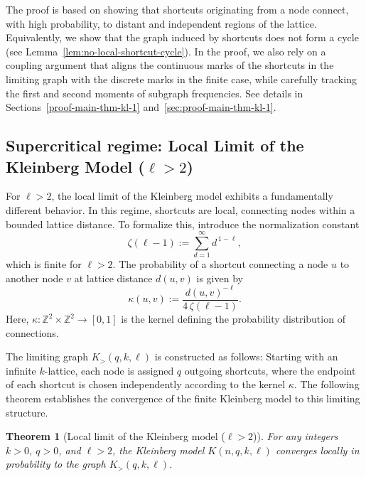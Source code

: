 \documentclass[10pt]{amsart}
\newtheorem{theorem}{Theorem}[section]
\begin{document}
The proof is based on showing that shortcuts originating from a node connect, with high probability, to distant and independent regions of the lattice.  Equivalently, we show that the graph induced by shortcuts does not form a cycle (see Lemma~\ref{lem:no-local-shortcut-cycle}).  In the proof, we also rely on a coupling argument that aligns the continuous marks of the shortcuts in the limiting graph with the discrete marks in the finite case, while carefully tracking the first and second moments of subgraph frequencies. See details in Sections~\ref{proof-main-thm-kl-1} and~\ref{sec:proof-main-thm-kl-1}. 


\subsection{Supercritical regime: Local Limit of the Kleinberg Model ($\ell > 2$)} \label{local-limit-kl-2}

For \(\ell > 2\), the local limit of the Kleinberg model exhibits a fundamentally different behavior. In this regime, shortcuts are local, connecting nodes within a bounded lattice distance. To formalize this, introduce the normalization constant
\[
\zeta(\ell-1) := \sum_{d=1}^{\infty} d^{\,1-\ell},
\]
which is finite for \(\ell > 2\). The probability of a shortcut connecting a node \(u\) to another node \(v\) at lattice distance \(d(u,v)\) is given by
\[
\kappa(u,v) := \frac{d(u,v)^{-\ell}}{4\,\zeta(\ell-1)}.
\]
Here, $\kappa:\mathbb{Z}^2\times\mathbb{Z}^2\to[0,1]$ is the kernel defining the probability distribution of connections.

The limiting graph \(K_>(q, k, \ell)\) is constructed as follows: Starting with an infinite \(k\)-lattice, each node is assigned \(q\) outgoing shortcuts, where the endpoint of each shortcut is chosen independently according to the kernel \(\kappa\). The following theorem establishes the convergence of the finite Kleinberg model to this limiting structure.

\begin{theorem} [Local limit of the Kleinberg model ($\ell > 2$)] \label{main-thm-kl-2}
For any integers \(k > 0\), \(q > 0\), and \(\ell > 2\), the Kleinberg model \(K(n, q, k, \ell)\) converges locally in probability to the graph \(K_>(q, k, \ell)\). 
\end{theorem}
\end{document}
